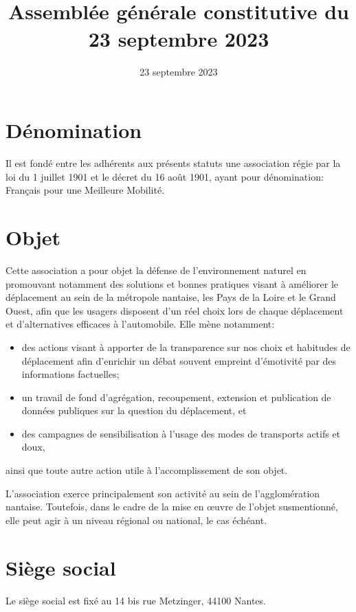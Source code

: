 \documentclass[11 pt]{article}
\title{\fmm \\[4mm]
\large Assemblée générale constitutive du 23 septembre 2023}
\date{23 septembre 2023}
\newcommand\fmm[0]{Français pour une Meilleure Mobilité}
\begin{document}
\maketitle

\section{Dénomination}

Il est fondé entre les adhérents aux présents statuts une association
régie par la loi du 1\ier{} juillet 1901 et le décret du 16 août 1901,
ayant pour dénomination: \og\fmm\fg.


\section{Objet}

Cette association a pour objet la défense de l’environnement naturel
en promouvant notamment des solutions et bonnes pratiques visant à
améliorer le déplacement au sein de la métropole nantaise, les Pays de
la Loire et le Grand Ouest, afin que les usagers disposent d’un réel
choix lors de chaque déplacement et d’alternatives efficaces à
l’automobile. Elle mène notamment:

\begin{itemize}
\item des actions visant à apporter de la transparence sur nos choix
  et habitudes de déplacement afin d’enrichir un débat souvent
  empreint d’émotivité par des informations factuelles;
\item un travail de fond d’agrégation, recoupement, extension et
  publication de données publiques sur la question du déplacement, et
\item des campagnes de sensibilisation à l’usage des modes de
  transports actifs et doux,
\end{itemize}
ainsi que toute autre action utile à l’accomplissement de son objet.

L’association exerce principalement son activité au sein de
l’agglomération nantaise. Toutefois, dans le cadre de la mise en
œuvre de l’objet susmentionné, elle peut agir à un niveau régional ou
national, le cas échéant.

\section{Siège social}

Le siège social est fixé au 14 bis rue Metzinger, 44100 Nantes.
\end{document}
